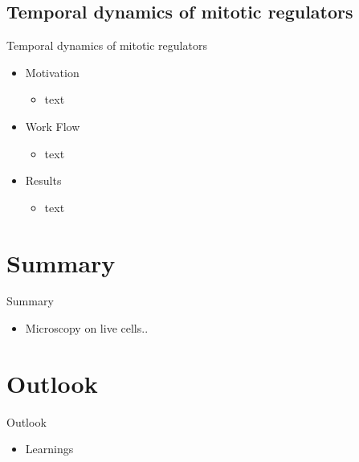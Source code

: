 \subsection{Temporal dynamics of mitotic regulators}
\begin{frame}{Temporal dynamics of mitotic regulators}
\begin{itemize}	
	\item Motivation
		\begin{itemize}	
			\item text
		\end{itemize}
	\item Work Flow
		\begin{itemize}	
			\item text
		\end{itemize}
	\item Results
		\begin{itemize}	
			\item text
		\end{itemize}	
\end{itemize}
\end{frame}

\section{Summary}

\begin{frame}{Summary}
\begin{itemize}
	\item Microscopy on live cells..
\end{itemize}
\end{frame}

\section{Outlook}
\begin{frame}{Outlook}
\begin{itemize}
	\item Learnings
\end{itemize}
\end{frame}
 

